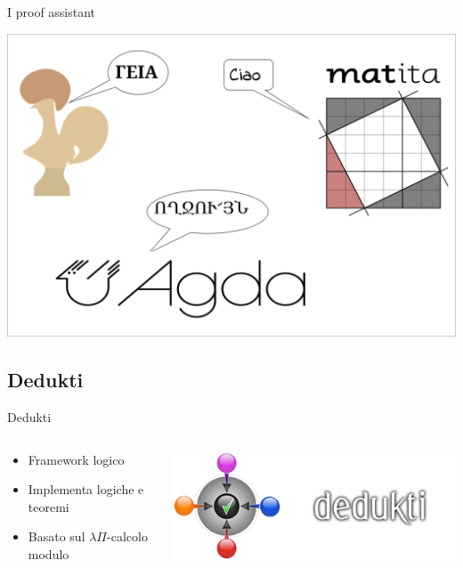 \documentclass{beamer}
\begin{document}
\begin{frame}{I proof assistant}
  \begin{center}
    \includegraphics[scale=0.25]{inter.png}
  \end{center}
\end{frame}

\subsection{Dedukti}
\begin{frame}{Dedukti}
\begin{columns}

\begin{column}{.5\textwidth}
\begin{itemize}
  \item Framework logico
  \vspace{1.5em}
  \item Implementa logiche e teoremi
  \vspace{1.5em}
  \item Basato sul $\lambda\Pi$-calcolo modulo
\end{itemize}
\end{column}

\begin{column}{.5\textwidth}
\includegraphics[scale=1]{dedukti2.png}
\end{column}
\end{columns}
\end{frame}
\end{document}
